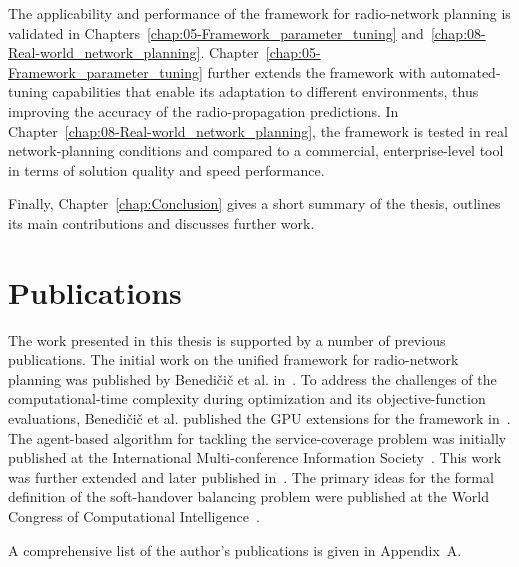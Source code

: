 The applicability and performance of the framework for radio-network
planning is validated in Chapters~\ref{chap:05-Framework_parameter_tuning}
and~\ref{chap:08-Real-world_network_planning}. Chapter~\ref{chap:05-Framework_parameter_tuning}
further extends the framework with automated-tuning capabilities that
enable its adaptation to different environments, thus improving the
accuracy of the radio-propagation predictions. In Chapter~\ref{chap:08-Real-world_network_planning},
the framework is tested in real network-planning conditions and compared
to a commercial, enterprise-level tool in terms of solution quality
and speed performance.

Finally, Chapter~\ref{chap:Conclusion} gives a short summary of
the thesis, outlines its main contributions and discusses further
work.


\section{Publications }

The work presented in this thesis is supported by a number of previous
publications. The initial work on the unified framework for radio-network
planning was published by Benedi\v{c}i\v{c} et al. in~\cite{Benedicic-A_GRASS_GIS_parallel_module_for_radio-propagation_predictions:2013}.
To address the challenges of the computational-time complexity during
optimization and its objective-function evaluations, Benedi\v{c}i\v{c}
et al. published the GPU extensions for the framework in~\cite{Benedicic-A_GPU_based_parallel_agent_optimization_approach:2013}.
The agent-based algorithm for tackling the service-coverage problem
was initially published at the International Multi-conference Information
Society~\cite{Benedicic_Pilot.power.optimization:2010}. This work
was further extended and later published in~\cite{Benedicic-A_GPU_based_parallel_agent_optimization_approach:2013}.
The primary ideas for the formal definition of the soft-handover balancing
problem were published at the World Congress of Computational Intelligence~\cite{Benedicic_Balancing_downlink_uplink_soft_handover_areas_in_UMTS_networks:2012}.

A comprehensive list of the author's publications is given in Appendix~A.

